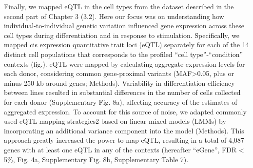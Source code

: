 Finally, we mapped eQTL in the cell types from the dataset described in the second part of Chapter 3 (3.2).
Here our focus was on understanding how individual-to-individual genetic variation influenced gene expression across these cell types during differentiation and in response to stimulation.
Specifically, we mapped cis expression quantitative trait loci (eQTL) separately for each of the 14 distinct cell populations that corresponds to the profiled “cell type”-“condition” contexts (fig.). 
eQTL were mapped by calculating aggregate expression levels for each donor, considering common gene-proximal variants (MAF>0.05, plus or minus 250 kb around genes; Methods). 
Variability in differentiation efficiency between lines resulted in substantial differences in the number of cells collected for each donor (Supplementary Fig. 8a), affecting accuracy of the estimates of aggregated expression. 
To account for this source of noise, we adapted commonly used eQTL mapping strategies2 based on linear mixed models (LMMs) by incorporating an additional variance component into the model (Methods). 
This approach greatly increased the power to map eQTL, resulting in a total of 4,087 genes with at least one eQTL in any of the contexts (hereafter “eGene”, FDR < 5\%, Fig. 4a, Supplementary Fig. 8b, Supplementary Table 7).
